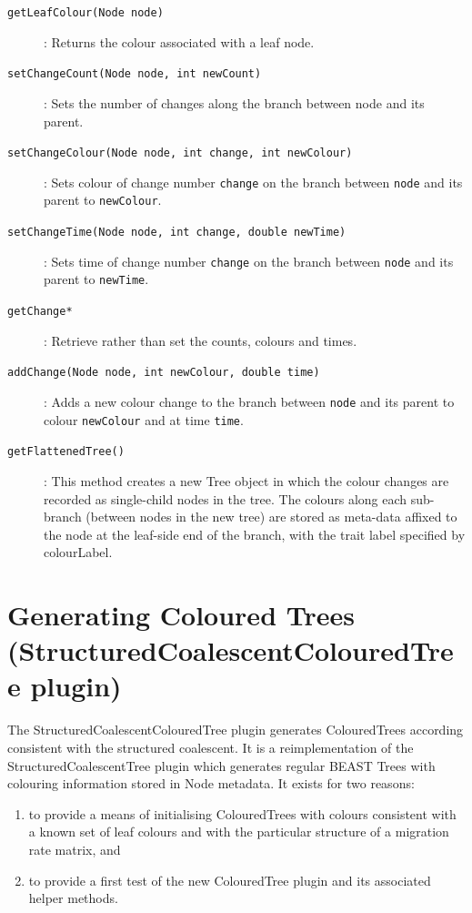 \documentclass[a4paper,11pt]{paper}
\newcommand{\class}[1]{\textsf{#1}}
\newcommand{\inp}[1]{\textsf{\color{blue}#1}}
\newcommand{\code}[1]{\texttt{#1}}
\begin{document}
\begin{description}
	\item[\code{getLeafColour(Node node)}]: Returns the colour
		associated with a leaf node.

	\item[\code{setChangeCount(Node node, int newCount)}]: Sets the
			number of changes along the branch between node and its
			parent.

	\item[\code{setChangeColour(Node node, int change, int
		newColour)}]: Sets colour of change number \code{change} on the branch
		between \code{node} and its parent to \code{newColour}.
	

	\item[\code{setChangeTime(Node node, int change, double newTime)}]:
		Sets time of change number \code{change} on the
		branch between \code{node} and its parent to \code{newTime}.
	
	\item[\code{getChange*}]: Retrieve rather than set the counts,
		colours and times.

	\item[\code{addChange(Node node, int newColour, double time)}]:
		Adds a new colour change to the branch between \code{node} and
		its parent to colour \code{newColour} and at time \code{time}.

	\item[\code{getFlattenedTree()}]: This method creates a new
		\class{Tree} object in which the colour changes are recorded
		as single-child nodes in the tree. The colours along each
		sub-branch (between nodes in the new tree) are stored as
		meta-data affixed to the node at the leaf-side end of the
		branch, with the trait label specified by \inp{colourLabel}.

\end{description}


\section{Generating Coloured Trees (StructuredCoalescentColouredTree plugin)}

The \class{StructuredCoalescentColouredTree} plugin generates
\class{ColouredTree}s according consistent with the structured
coalescent.  It is a reimplementation of the
\class{StructuredCoalescentTree} plugin which generates regular BEAST
\class{Tree}s with colouring information stored in \class{Node}
metadata. It exists for two reasons:
\begin{enumerate}
	\item to provide a means of initialising \class{ColouredTree}s
		with colours consistent with a known set of leaf colours and with the
		particular structure of a migration rate matrix, and
	\item to provide a first test of the new \class{ColouredTree}
		plugin and its associated helper methods.
\end{enumerate}
\end{document}
